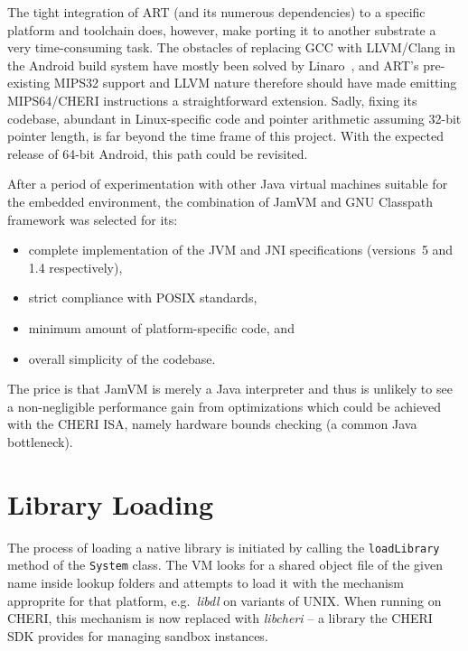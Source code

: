 \documentclass[a4paper,12pt,twoside,openright]{report}
\newcommand{\class}[1]{\texttt{#1}}
\newcommand{\tool}[1]{\emph{#1}}
\newcommand{\lib}[1]{\tool{lib#1}}
\begin{document}
The tight integration of ART (and its numerous dependencies) to a specific platform and toolchain does, however, make porting it to another substrate a very time-consuming task. The obstacles of replacing GCC with LLVM{\slash}Clang in the Android build system have mostly been solved by Linaro~\cite{Linaro:AndroidWithClang}, and ART's pre-existing MIPS32 support and LLVM nature therefore should have made emitting MIPS64/CHERI instructions a straightforward extension. Sadly, fixing its codebase, abundant in Linux-specific code and pointer arithmetic assuming 32-bit pointer length, is far beyond the time frame of this project. With the expected release of 64-bit Android, this path could be revisited.

After a period of experimentation with other Java virtual machines suitable for the embedded environment, the combination of JamVM and GNU Classpath framework was selected for its:
\begin{itemize}
\item complete implementation of the JVM and JNI specifications (versions~5 and 1.4 respectively),
\item strict compliance with POSIX standards,
\item minimum amount of platform-specific code, and
\item overall simplicity of the codebase.
\end{itemize}
The price is that JamVM is merely a Java interpreter and thus is unlikely to see a non-negligible performance gain from optimizations which could be achieved with the CHERI ISA, namely hardware bounds checking (a common Java bottleneck).

\section{Library Loading}

The process of loading a native library is initiated by calling the \texttt{loadLibrary} method of the \class{System} class. The VM looks for a shared object file of the given name inside lookup folders and attempts to load it with the mechanism approprite for that platform, e.g.\ \lib{dl} on variants of UNIX. When running on CHERI, this mechanism is now replaced with \lib{cheri} -- a library the CHERI SDK provides for managing sandbox instances. 
\end{document}
